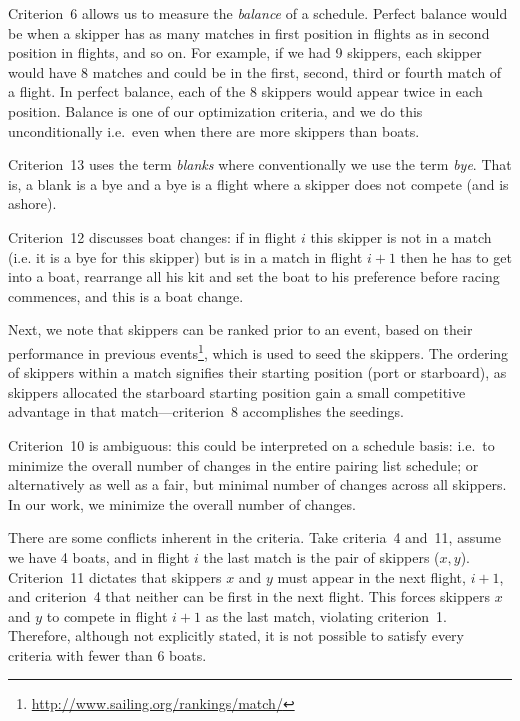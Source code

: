\documentclass{llncs}
\begin{document}
Criterion~6 allows us to measure the \emph{balance} of a schedule. Perfect balance would be when a skipper has as many matches in first position in flights as in second position in flights, and so on. For example, if we had 9 skippers, each skipper would have 8 matches and could be in the first, second, third or fourth match of a flight. In perfect balance, each of the 8 skippers would appear twice in each position. Balance is one of our optimization criteria, and we do this unconditionally i.e.\ even when there are more skippers than boats.

Criterion~13 uses the term \emph{blanks} where conventionally we use the term \emph{bye}. That is, a blank is a bye and a bye is a flight where a skipper does not compete (and is ashore).

Criterion~12 discusses boat changes: if in flight $i$ this skipper is not in a match (i.e. it is a
bye for this skipper) but is in a match in flight $i+1$ then he has to get into a boat, rearrange
all his kit and set the boat to his preference before racing commences, and this is a boat change. 

Next, we note that skippers can be ranked prior to an event, based on their performance in
previous events\footnote{\url{http://www.sailing.org/rankings/match/}}, which is used to seed the
skippers. The ordering of skippers within a match signifies their starting position (port or
starboard), as skippers allocated the starboard starting position gain a small competitive
advantage in that match---criterion~8 accomplishes the seedings.

Criterion~10 is ambiguous: this could be interpreted on a schedule basis: i.e.\ to minimize the
overall number of changes in the entire pairing list schedule; or alternatively as well as a fair,
but minimal number of changes across all skippers. In our work, we minimize the overall number of changes.

There are some conflicts inherent in the criteria. Take criteria~4 and~11, assume we have 4 boats, and
in flight $i$ the last match is the pair of skippers ($x,y$). Criterion~11 dictates that skippers $x$
and $y$ must appear in the next flight, $i+1$, and criterion~4 that neither can be first in the next
flight. This forces skippers $x$ and $y$ to compete in flight $i+1$ as the last match, violating
criterion~1. Therefore, although not explicitly stated, it is not possible to satisfy every criteria
with fewer than 6 boats.
\end{document}
